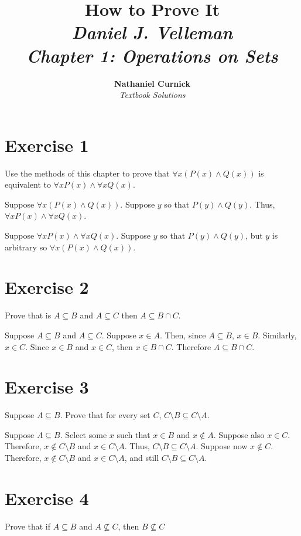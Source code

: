 \documentclass[11pt]{article}
\title{\textbf{How to Prove It} \\ {\Large\itshape Daniel J. Velleman} \\ {\Large\itshape Chapter 1: Operations on Sets}}
\author{\textbf{Nathaniel Curnick} \\ \textit{Textbook Solutions}}
\date{}
\begin{document}
\maketitle

\section*{Exercise 1}

Use the methods of this chapter to prove that $\forall x (P(x) \wedge Q(x))$ is 
equivalent to $\forall x P(x) \wedge \forall x Q(x)$.

Suppose $\forall x(P(x) \wedge Q(x))$. Suppose $y$ so that $P(y) \wedge Q(y)$.
Thus, $\forall x P(x) \wedge \forall x Q(x)$.

Suppose $\forall x P(x) \wedge \forall x Q(x)$. Suppose $y$ so that 
$P(y) \wedge Q(y)$, but $y$ is arbitrary so $\forall x (P(x) \wedge Q(x))$.

\section*{Exercise 2} 

Prove that is $A \subseteq B$ and $A \subseteq C$ then $A \subseteq B \cap C$.

Suppose $A \subseteq B$ and $A \subseteq C$. Suppose $x \in A$. Then, since 
$A \subseteq B$, $x \in B$. Similarly, $x \in C$. Since $x \in B$ and $x \in C$, 
then $x \in B \cap C$. Therefore $A \subseteq B \cap C$. 

\section*{Exercise 3}

Suppose $A \subseteq B$. Prove that for every set $C$, 
$C \setminus B \subseteq C \setminus A$.

Suppose $A \subseteq B$. Select some $x$ such that $x \in B$ and $x \notin A$. 
Suppose also $x \in C$. Therefore, $x \notin C \setminus B$ and 
$x \in C \setminus A$. Thus, $C \setminus B \subseteq C \setminus A$. Suppose 
now $x \notin C$. Therefore, $x \notin C \setminus B$ and $x \in C \setminus A$,
and still $C \setminus B \subseteq C \setminus A$.

\section*{Exercise 4}

Prove that if $A \subseteq B$ and $A \nsubseteq C$, then $B \nsubseteq C$
\end{document}
